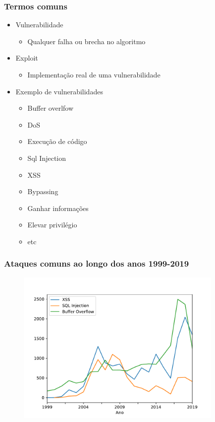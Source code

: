 \documentclass{beamer}
\begin{document}
\begin{frame}
	\frametitle{Termos comuns}
	
	\begin{itemize}
		\item Vulnerabilidade
		\begin{itemize}
			\item Qualquer falha ou brecha no algoritmo
		\end{itemize}
		\item Exploit
		\begin{itemize}
			\item Implementação real de uma vulnerabilidade
		\end{itemize}
		\item Exemplo de vulnerabilidades
		\begin{itemize}
			\item Buffer overlfow
			\item DoS
			\item Execução de código
			\item Sql Injection
			\item XSS
			\item Bypassing
			\item Ganhar informações
			\item Elevar privilégio
			\item etc
		\end{itemize}
	\end{itemize}
\end{frame}
\begin{frame}
	\frametitle{Ataques comuns ao longo dos anos 1999-2019}
	\begin{figure}[htp]
			\includegraphics[width=10cm]{no_ataques.pdf}
		\end{figure}
\end{frame}
\end{document}
